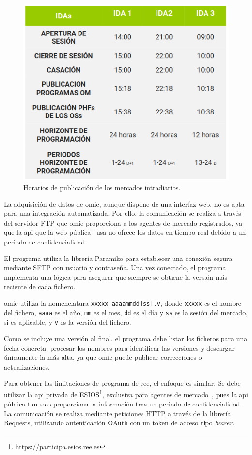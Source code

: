 \begin{figure}
  \centering
  \includegraphics[width=0.5\linewidth]{figures/horarios-publicacion.png}
  \caption[Horarios de publicación de mercados intradiarios.]{Horarios de publicación de los mercados intradiarios.}
  \label{fig:horarios-publicacion}
\end{figure}

La adquisición de datos de \gls{omie}, aunque dispone de una interfaz web, no es apta para una integración automatizada. Por ello, la comunicación se realiza a través del servidor FTP que \gls{omie} proporciona a los agentes de mercado registrados, ya que la \gls{api} que la web pública~\cite{omie2025acceso} usa no ofrece los datos en tiempo real debido a un periodo de confidencialidad.

El programa utiliza la librería Paramiko para establecer una conexión segura mediante SFTP con usuario y contraseña. Una vez conectado, el programa implementa una lógica para asegurar que siempre se obtiene la versión más reciente de cada fichero.

\Gls{omie} utiliza la nomenclatura \texttt{xxxxx\_aaaammdd[ss].v}, donde \texttt{xxxxx} es el nombre del fichero, \texttt{aaaa} es el año, \texttt{mm} es el mes, \texttt{dd} es el día y \texttt{ss} es la sesión del mercado, si es aplicable, y \texttt{v} es la versión del fichero.

Como se incluye una versión al final, el programa debe listar los ficheros para una fecha concreta, procesar los nombres para identificar las versiones y descargar únicamente la más alta, ya que \gls{omie} puede publicar correcciones o actualizaciones.

Para obtener las limitaciones de programa de \gls{ree}, el enfoque es similar. Se debe utilizar la \gls{api} privada de ESIOS\footnote{\url{https://participa.esios.ree.es}}, exclusiva para agentes de mercado~\cite{red2025esios}, pues la \gls{api} pública tan solo proporciona la información tras un periodo de confidencialidad. La comunicación se realiza mediante peticiones HTTP a través de la librería Requests, utilizando autenticación OAuth con un token de acceso tipo \textit{bearer}.

